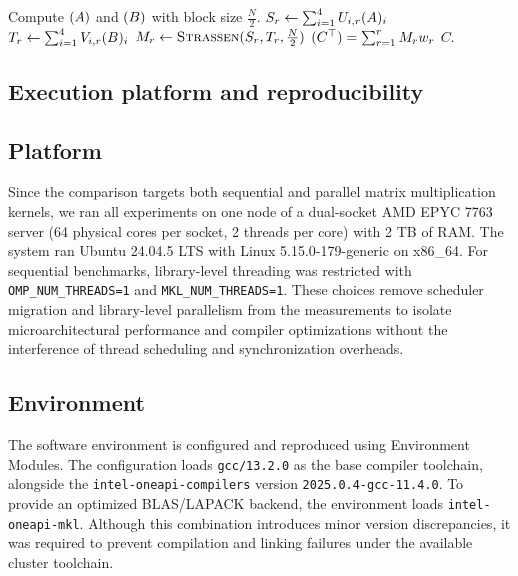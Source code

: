 \documentclass[a4paper, leqno, 11pt]{article}
\let\Vec\relax
\DeclareMathOperator{\Vec}{vec}
\let\vec\relax
\DeclareRobustCommand{\vec}{\Vec}
\theoremstyle{definition}
\theoremstyle{remark}
\theoremstyle{experimental}
\begin{document}
\begin{algorithm}[ht!]
\caption{Strassen algorithm using CP factorization.}
\label{alg:strassen}
\begin{algorithmic}[1]
    \State {}
  \EndIf
  \State {}
  \EndIf
    \State {} 
  \EndIf
  \State Compute $ \vec(A) $ and $ \vec(B) $ with block size $ \frac{N}{2} $.
  \State  $ S_r \leftarrow \sum_{i=1}^{4} U_{i,r} \vec(A)_i$
  \State  $ T_r \leftarrow \sum_{i=1}^{4} V_{i,r} \vec(B)_i$
  \State $ M_r \gets\Call{Strassen}{S_r,T_r,\frac{N}{2}} $  
  \EndFor
  \State $ \Vec(C^\top) = \sum_{r=1}^r M_r w_r$
  \State \Return $ C $.
\EndProcedure
\end{algorithmic}
\end{algorithm}


\subsection{Execution platform and reproducibility}

\subsection*{Platform}
Since the comparison targets both sequential and parallel matrix multiplication kernels, we ran all experiments on one node of a dual-socket AMD EPYC 7763 server (64 physical cores per socket, 2 threads per core) with 2 TB of RAM. The system ran Ubuntu 24.04.5 LTS with Linux 5.15.0-179-generic on x86\_64. For sequential benchmarks, library-level threading was restricted with \texttt{OMP\_NUM\_THREADS=1} and \texttt{MKL\_NUM\_THREADS=1}. These choices remove scheduler migration and library-level parallelism from the measurements to isolate microarchitectural performance and compiler optimizations without the interference of thread scheduling and synchronization overheads. 

\subsection*{Environment}

The software environment is configured and reproduced using Environment
Modules. The configuration loads \texttt{gcc/13.2.0} as the base compiler toolchain, alongside the
\texttt{intel-oneapi-compilers} version \texttt{2025.0.4-gcc-11.4.0}. To provide an optimized
BLAS/LAPACK backend, the environment loads \texttt{intel-oneapi-mkl}. Although this combination introduces minor version discrepancies, it was required to prevent compilation and linking failures under the available cluster toolchain.
\end{document}
